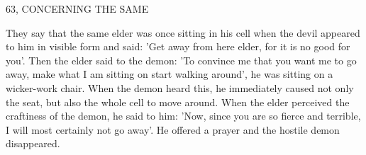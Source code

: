 63, CONCERNING THE SAME

They say that the same elder was once sitting in his cell when the
devil appeared to him in visible form and said: 'Get away from here
elder, for it is no good for you'. Then the elder said to the demon:
'To convince me that you want me to go away, make what I am
sitting on start walking around', he was sitting on a wicker-work
chair. When the demon heard this, he immediately caused not only
the seat, but also the whole cell to move around. When the elder
perceived the craftiness of the demon, he said to him: 'Now, since
you are so fierce and terrible, I will most certainly not go away'. He
offered a prayer and the hostile demon disappeared.

